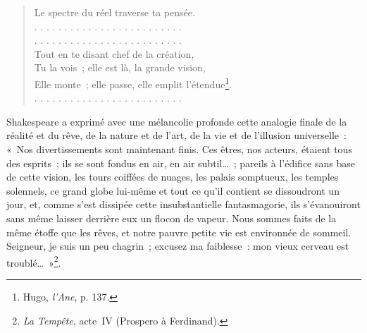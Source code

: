 \documentclass[french,twoside]{book} %
\begin{document}
\begin{verse}
Le spectre du réel traverse ta pensée.\\
. . . . . . . . . . . . . . . . . . . . . . . . .\\
. . . . . . . . . . . . . . . . . . . . . . . . .\\
Tout en te disant chef de la création,\\
Tu la vois ; elle est là, la grande vision,\\
Elle monte ; elle passe, elle emplit l’étendue\footnote{ Hugo, \emph{l’Ane}, p. 137.}.\\
. . . . . . . . . . . . . . . . . . . . . . . . .\\
\end{verse}

\noindent Shakespeare a exprimé avec une mélancolie profonde cette analogie finale de la réalité et du rêve, de la nature et de l’art, de la vie et de l’illusion universelle : « Nos divertissements sont maintenant finis. Ces êtres, nos acteurs, étaient tous des esprits ; ils se sont fondus en air, en air subtil… ; pareils à l’édifice sans base de cette vision, les tours coiffées de nuages, les palais somptueux, les temples solennels, ce grand globe lui-même et tout ce qu’il contient se dissoudront un jour, et, comme s’est dissipée cette insubstantielle fantasmagorie, ils s’évanouiront sans même laisser derrière eux un flocon de vapeur. Nous sommes faits de la même étoffe que les rêves, et notre pauvre petite vie est environnée de sommeil. Seigneur, je suis un peu chagrin ; excusez ma faiblesse : mon vieux cerveau est troublé… »\footnote{\emph{La Tempête}, acte IV (Prospero à Ferdinand).}.\par
\end{document}
